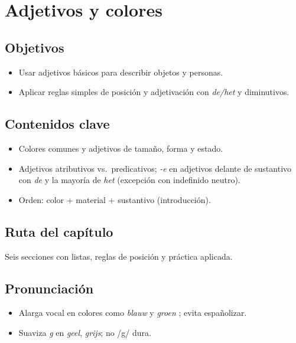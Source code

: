 \chapter{Adjetivos y colores}
\section{Objetivos}
\begin{itemize}[leftmargin=*]
	\item Usar adjetivos básicos para describir objetos y personas.
	\item Aplicar reglas simples de posición y adjetivación con \textit{de/het} y diminutivos.
\end{itemize}

\section{Contenidos clave}
\begin{itemize}[leftmargin=*]
	\item Colores comunes y adjetivos de tamaño, forma y estado.
	\item Adjetivos atributivos vs.\ predicativos; \textit{-e} en adjetivos delante de sustantivo con \textit{de} y la mayoría de \textit{het} (excepción con indefinido neutro).
	\item Orden: color + material + sustantivo (introducción).
\end{itemize}

\section{Ruta del capítulo}
Seis secciones con listas, reglas de posición y práctica aplicada.








\section{Pronunciación}
\begin{itemize}[leftmargin=*]
	\item Alarga vocal en colores como \textit{blauw}  y \textit{groen} ; evita españolizar.
	\item Suaviza \textit{g} en \textit{geel}, \textit{grijs}; no /g/ dura.
\end{itemize}

